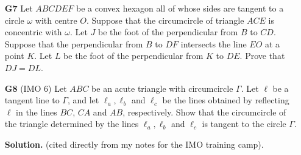 \documentclass[11pt,a4paper]{article}
\begin{document}
\begin{enumerate}
	\item [\textbf{G7}] Let $ABCDEF$ be a convex hexagon all of whose sides are tangent to a circle $\omega$ with centre $O$. Suppose that the circumcircle of triangle $ACE$ is concentric with $\omega$. Let $J$ be the foot of the perpendicular from $B$ to $CD$. Suppose that the perpendicular from $B$ to $DF$ intersects the line $EO$ at a point $K$. Let $L$ be the foot of the perpendicular from $K$ to $DE$. Prove that $DJ=DL$.
	
	
	
	\item[\textbf{G8}] (IMO 6)
	Let $ABC$ be an acute triangle with circumcircle $\Gamma$. Let $\ell$ be a tangent line to $\Gamma$, and let $\ell_a, \ell_b$ and $\ell_c$ be the lines obtained by reflecting $\ell$ in the lines $BC$, $CA$ and $AB$, respectively. Show that the circumcircle of the triangle determined by the lines $\ell_a, \ell_b$ and $\ell_c$ is tangent to the circle $\Gamma$.
	
	\textbf {Solution.} (cited directly from my notes for the IMO training camp). 
	
	\usetikzlibrary{arrows}
	

\end{enumerate}
\end{document}

